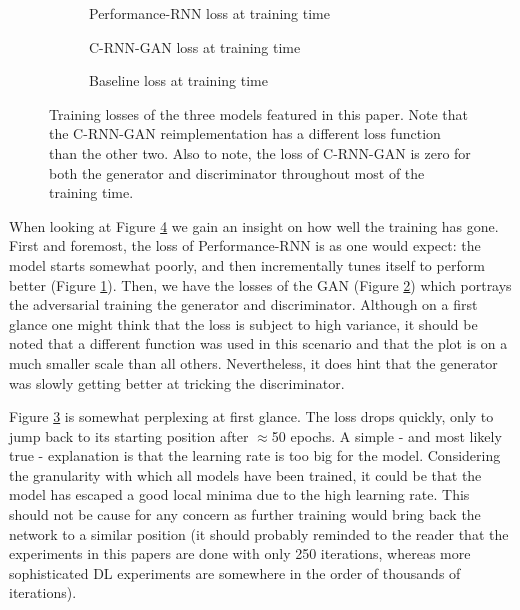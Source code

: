 \documentclass[a4paper]{book}
\begin{document}
\begin{figure}[ht]
    \newlength\figureheight
    \newlength\figurewidth
    \setlength\figureheight{6cm}
    \setlength\figurewidth{6cm}

    \begin{subfigure}{0.5\linewidth}
        \centering
        
        \caption{Performance-RNN loss at training time}
        \label{fig:loss_performancernn}
    \end{subfigure}
    \begin{subfigure}{0.5\linewidth}
        \centering
        
        \caption{C-RNN-GAN loss at training time}
        \label{fig:loss_crnngan}
    \end{subfigure}

    \setlength\figureheight{10cm}
    \setlength\figurewidth{10cm}

    \begin{subfigure}{\linewidth}
        \centering
        
        \caption{Baseline loss at training time}
        \label{fig:loss_baseline}
    \end{subfigure}
    \caption{Training losses of the three models featured in this paper. Note that the C-RNN-GAN reimplementation has a different loss function than the other two. Also to note, the loss of C-RNN-GAN is zero for both the generator and discriminator throughout most of the training time.}
    \label{fig:loss}
\end{figure}

When looking at Figure \ref{fig:loss} we gain an insight on how well the training has gone. First and foremost, the loss of Performance-RNN is as one would expect: the model starts somewhat poorly, and then incrementally tunes itself to perform better (Figure \ref{fig:loss_performancernn}). Then, we have the losses of the GAN (Figure \ref{fig:loss_crnngan}) which portrays the adversarial training the generator and discriminator. Although on a first glance one might think that the loss is subject to high variance, it should be noted that a different function was used in this scenario and that the plot is on a much smaller scale than all others. Nevertheless, it does hint that the generator was slowly getting better at tricking the discriminator.

Figure \ref{fig:loss_baseline} is somewhat perplexing at first glance. The loss drops quickly, only to jump back to its starting position after $\approx$50 epochs. A simple - and most likely true - explanation is that the learning rate is too big for the model. Considering the granularity with which all models have been trained, it could be that the model has escaped a good local minima due to the high learning rate. This should not be cause for any concern as further training would bring back the network to a similar position (it should probably reminded to the reader that the experiments in this papers are done with only 250 iterations, whereas more sophisticated DL experiments are somewhere in the order of thousands of iterations). 
\end{document}
